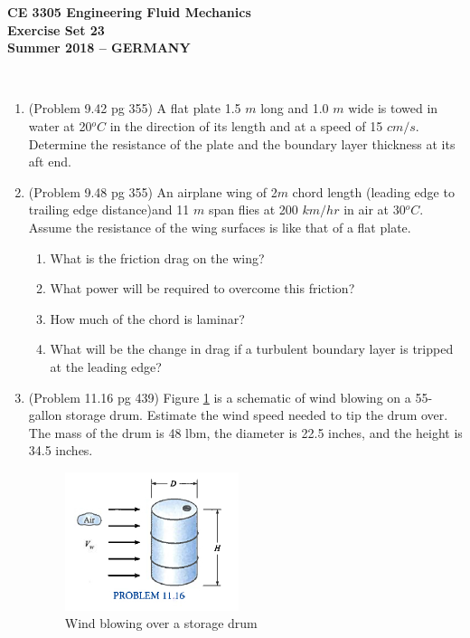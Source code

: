 \documentclass[12pt]{article}
\begin{document}
\begingroup
\begin{center}
{\textbf{{ CE 3305 Engineering Fluid Mechanics} \\ Exercise Set 23 \\ Summer 2018 -- GERMANY} }
\end{center}
\endgroup
\begingroup
~\newline

\begin{enumerate}
\item (Problem 9.42 pg 355) A flat plate 1.5 $m$ long and 1.0 $m$ wide is towed in water at 20$^oC$ in the direction of its length and at a speed of 15 $cm/s$.  Determine the resistance of the plate and the boundary layer thickness at its aft end.

\item (Problem 9.48 pg 355) An airplane wing of 2$m$ chord length (leading edge to trailing edge distance)and 11 $m$ span flies at 200 $km/hr$ in air at 30$^oC$.  Assume the resistance of the wing surfaces is like that of a flat plate.
\begin{enumerate}
\item What is the friction drag on the wing?
\item What power will be required to overcome this friction?
\item How much of the chord is laminar?
\item What will be the change in drag if a turbulent boundary layer is tripped at the leading edge?
\end{enumerate}


\item (Problem 11.16 pg 439)  Figure \ref{fig:WindDrum} is a schematic of wind blowing on a 55-gallon storage drum.  Estimate the wind speed needed to tip the drum over.  The mass of the drum is 48 lbm, the diameter is 22.5 inches, and the height is 34.5 inches.
\begin{figure}[htbp] %
   \centering
   \includegraphics[width=2in]{WindDrum.jpg} 
   \caption{Wind blowing over a storage drum}
   \label{fig:WindDrum}
\end{figure}


\end{enumerate}
\end{document}
